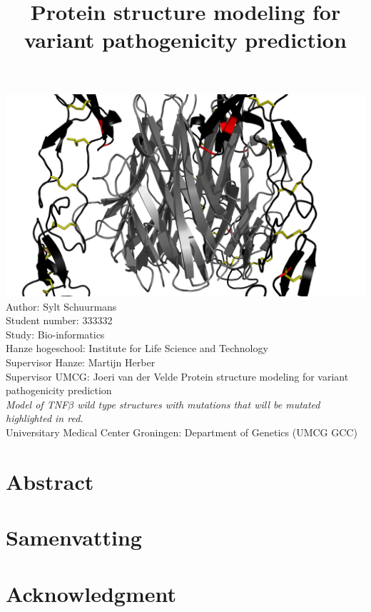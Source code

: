 \documentclass[10pt]{article}
\title{Protein structure modeling for variant pathogenicity prediction}
\begin{document}
	\maketitle
	\includegraphics[width=\textwidth]{Relax_Pymol_Images/TNFB_wild}
	\vfill
	\noindent
	Author: Sylt Schuurmans\\
	Student number: 333332\\
	Study: Bio-informatics\\
	Hanze hogeschool: Institute for Life Science and Technology\\
	Supervisor Hanze: Martijn Herber\\
	Supervisor UMCG: Joeri van der Velde
	\newpage
	\vspace*{\fill}
	\noindent
	Protein structure modeling for variant pathogenicity prediction\\
	\textit{Model of TNF$\beta$ wild type structures with mutations that will be mutated highlighted in red.}\\
	Universitary Medical Center Groningen: Department of Genetics (UMCG GCC)\\
	\newpage
	
	\section*{Abstract}
	
	\newpage
	
	\section*{Samenvatting}
	
	\newpage
	
	\section*{Acknowledgment}
	
	\newpage
	
\end{document}
